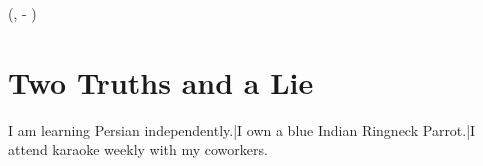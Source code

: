 \begin{textblock*}{\textwidth}(\leftmargin, \paperheight- \bottombarsolidheight)
{\color{AnthropicDarkerGray}\section*{\hspace{3.5pt}Two Truths and a Lie}
\mbox{\hspace{6pt}}I am learning Persian independently.\hspace{6pt}|\hspace{6pt}I own a blue Indian Ringneck Parrot.\hspace{6pt}|\hspace{6pt}I attend karaoke weekly with my coworkers.\mbox{\hspace{6pt}} \mbox{\hspace{6pt}}}
\end{textblock*}
